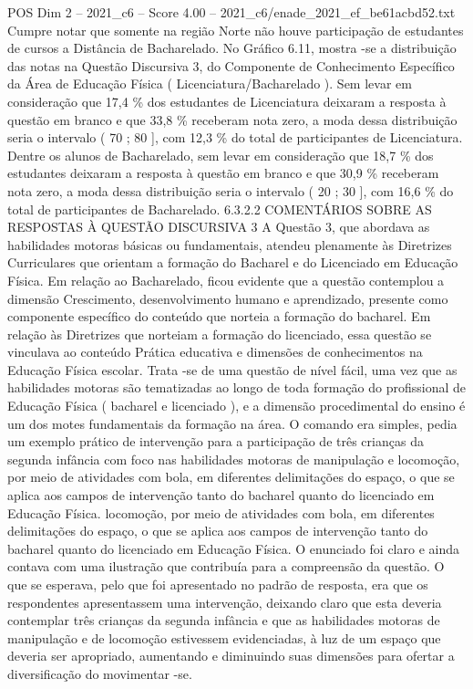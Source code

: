 \begin{textsample}{POS Dim 2 – 2021\_c6 – Score 4.00 – 2021\_c6/enade\_2021\_ef\_be61acbd52.txt}
Cumpre notar que somente na região Norte não houve participação de estudantes de cursos a Distância de Bacharelado.
No Gráfico 6.11, mostra -se a distribuição das notas na Questão Discursiva 3, do Componente de Conhecimento Específico da Área de Educação Física ( Licenciatura/Bacharelado ).
Sem levar em consideração que 17,4 \% dos estudantes de Licenciatura deixaram a resposta à questão em branco e que 33,8 \% receberam nota zero, a moda dessa distribuição seria o intervalo ( 70 ; 80 ], com 12,3 \% do total de participantes de Licenciatura.
Dentre os alunos de Bacharelado, sem levar em consideração que 18,7 \% dos estudantes deixaram a resposta à questão em branco e que 30,9 \% receberam nota zero, a moda dessa distribuição seria o intervalo ( 20 ; 30 ], com 16,6 \% do total de participantes de Bacharelado. 6.3.2.2 COMENTÁRIOS SOBRE AS RESPOSTAS À QUESTÃO DISCURSIVA 3 A Questão 3, que abordava as habilidades motoras básicas ou fundamentais, atendeu plenamente às Diretrizes Curriculares que orientam a formação do Bacharel e do Licenciado em Educação Física.
Em relação ao Bacharelado, ficou evidente que a questão contemplou a dimensão Crescimento, desenvolvimento humano e aprendizado, presente como componente específico do conteúdo que norteia a formação do bacharel.
Em relação às Diretrizes que norteiam a formação do licenciado, essa questão se vinculava ao conteúdo Prática educativa e dimensões de conhecimentos na Educação Física escolar.
Trata -se de uma questão de nível fácil, uma vez que as habilidades motoras são tematizadas ao longo de toda formação do profissional de Educação Física ( bacharel e licenciado ), e a dimensão procedimental do ensino é um dos motes fundamentais da formação na área.
O comando era simples, pedia um exemplo prático de intervenção para a participação de três crianças da segunda infância com foco nas habilidades motoras de manipulação e locomoção, por meio de atividades com bola, em diferentes delimitações do espaço, o que se aplica aos campos de intervenção tanto do bacharel quanto do licenciado em Educação Física. locomoção, por meio de atividades com bola, em diferentes delimitações do espaço, o que se aplica aos campos de intervenção tanto do bacharel quanto do licenciado em Educação Física.
O enunciado foi claro e ainda contava com uma ilustração que contribuía para a compreensão da questão.
O que se esperava, pelo que foi apresentado no padrão de resposta, era que os respondentes apresentassem uma intervenção, deixando claro que esta deveria contemplar três crianças da segunda infância e que as habilidades motoras de manipulação e de locomoção estivessem evidenciadas, à luz de um espaço que deveria ser apropriado, aumentando e diminuindo suas dimensões para ofertar a diversificação do movimentar -se.

\end{textsample}
